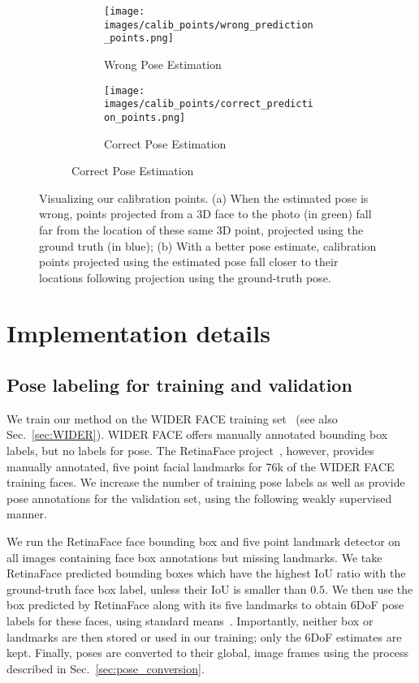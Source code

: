 \documentclass[final]{cvpr}
\begin{document}
\begin{figure}
    \begin{subfigure}[b]{0.475\textwidth}
        \begin{subfigure}[b]{0.495\textwidth}
            \centering
            \texttt{[image: images/calib\_points/wrong\_prediction\_points.png]}
            \caption{Wrong Pose Estimation}
        \end{subfigure}
        \hfill
            \begin{subfigure}[b]{0.495\textwidth}
            \centering
            \texttt{[image: images/calib\_points/correct\_prediction\_points.png]}
            \caption{Correct Pose Estimation}
        \end{subfigure}
    \end{subfigure}\vspace{-2mm}
    \caption{Visualizing our calibration points. (a) When the estimated pose is wrong, points projected from a 3D face to the photo (in green) fall far from the location of these same 3D point, projected using the ground truth (in blue); (b) With a better pose estimate, calibration points projected using the estimated pose fall closer to their locations following projection using the ground-truth pose.\vspace{-2mm}}
    \label{fig:calibpoints}
\end{figure}

\section{Implementation details}
\subsection{Pose labeling for training and validation}\label{sec:trainingdata}
We train our method on the WIDER FACE training set~\cite{wider_face} (see also Sec.~\ref{sec:WIDER}). WIDER FACE offers manually annotated bounding box labels, but no labels for pose. The RetinaFace project~\cite{retinaface}, however, provides manually annotated, five point facial landmarks for 76k of the WIDER FACE training faces. We increase the number of training pose labels as well as provide pose annotations for the validation set, using the following weakly supervised manner. 


We run the RetinaFace face bounding box and five point landmark detector on all images containing face box annotations but missing landmarks. We take RetinaFace predicted bounding boxes which have the highest IoU ratio with the ground-truth face box label, unless their IoU is smaller than $0.5$. We then use the box predicted by RetinaFace along with its five landmarks to obtain 6DoF pose labels for these faces, using standard means~\cite{posit, epnp}. Importantly, neither box or landmarks are then stored or used in our training; only the 6DoF estimates are kept. Finally, poses are converted to their global, image frames using the process described in Sec.~\ref{sec:pose_conversion}. 
\end{document}
